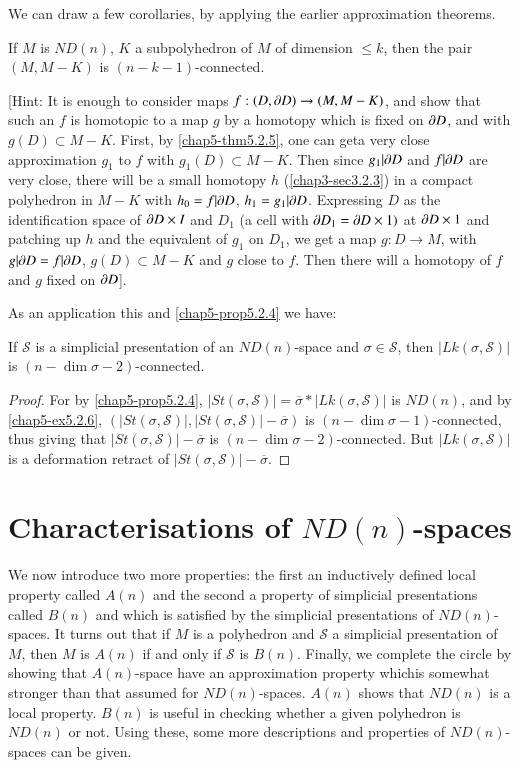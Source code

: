 We can draw a few corollaries, by applying the earlier approximation theorems.

\begin{ex}\label{chap5-ex5.2.6}
If $M$ is $ND(n)$, $K$ a subpolyhedron of $M$ of dimension $ \leq k$, then the pair $(M,M-K)$ is $(n-k-1)$-connected.
\end{ex}

[Hint: It is enough to consider maps $f:(D,\partial D)\to (M,M-K)$, and show that such an $f$ is homotopic to a map $g$ by a homotopy which is fixed on $\partial D$, and with $g(D)\subset M-K$. First, by \ref{chap5-thm5.2.5}, one can get\pageoriginale a very close approximation $g_{1}$ to $f$ with $g_{1}(D)\subset M-K$. Then since $g_{1}|\partial D$ and $f|\partial D$ are very close, there will be a small homotopy $h$ (\ref{chap3-sec3.2.3}) in a compact polyhedron in $M-K$ with $h_{0}=f|\partial D$, $h_{1}=g_{1}|\partial D$. Expressing $D$ as the identification space of $\partial D\times I$ and $D_{1}$ (a cell with $\partial D_{1}=\partial D\times 1)$ at $\partial D\times 1$ and patching up $h$ and the equivalent of $g_{1}$ on $D_{1}$, we get a map $g:D\to M$, with $g|\partial D=f|\partial D$, $g(D)\subset M-K$ and $g$ close to $f$. Then there will a homotopy of $f$ and $g$ fixed on $\partial D$].

As an application this and \ref{chap5-prop5.2.4} we have:

\begin{proposition}\label{chap5-prop5.2.7}
If $\mathscr{S}$ is a simplicial presentation of an $ND(n)$-space and $\sigma\in \mathscr{S}$, then $|Lk(\sigma,\mathscr{S})|$ is $(n-\dim \sigma-2)$-connected. 
\end{proposition}

\begin{proof}
For by \ref{chap5-prop5.2.4}, $|St(\sigma,\mathscr{S})|=\overline{\sigma}\ast|Lk(\sigma,\mathscr{S})|$ is $ND(n)$, and by \ref{chap5-ex5.2.6}, $(|St(\sigma,\mathscr{S})|, |St(\sigma,\mathscr{S})|-\overline{\sigma})$ is $(n-\dim \sigma-1)$-connected, thus giving that $|St(\sigma,\mathscr{S})|-\overline{\sigma}$ is $(n-\dim \sigma-2)$-connected. But $|Lk(\sigma,\mathscr{S})|$ is a deformation retract of $|St(\sigma,\mathscr{S})|-\overline{\sigma}$.
\end{proof}

\section{Characterisations of $ND(n)$-spaces}\label{chap5-sec5.3}

We now introduce two more properties: the first an inductively defined local property called $A(n)$ and the second a property of simplicial presentations called $B(n)$ and which is satisfied by the simplicial presentations of $ND(n)$-spaces. It turns out that if $M$ is a polyhedron and $\mathscr{S}$ a simplicial presentation of $M$, then $M$ is $A(n)$ if and only if $\mathscr{S}$ is $B(n)$. Finally, we complete the circle by showing that $A(n)$-space have an approximation property which\pageoriginale is somewhat stronger than that assumed for $ND(n)$-spaces. $A(n)$ shows that $ND(n)$ is a local property. $B(n)$ is useful in checking whether a given polyhedron is $ND(n)$ or not. Using these, some more descriptions and properties of $ND(n)$-spaces can be given.

